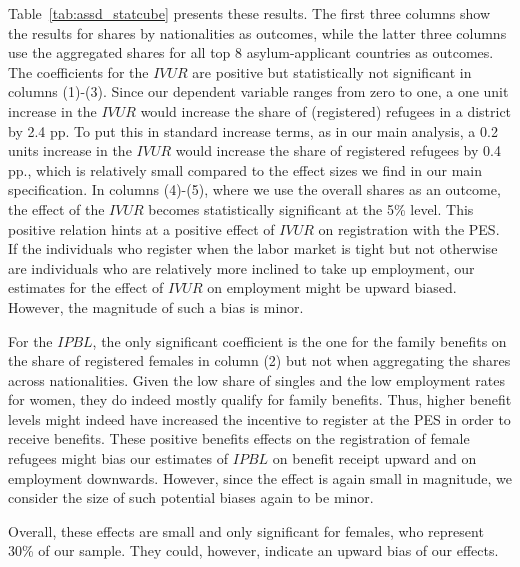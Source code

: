 Table~\ref{tab:assd_statcube} presents these results. The first three columns show the results for shares by nationalities as outcomes, while the latter three columns use the aggregated shares for all top 8 asylum-applicant countries as outcomes. The coefficients for the $IVUR$ are positive but statistically not significant in columns (1)-(3). Since our dependent variable ranges from zero to one, a one unit increase in the $IVUR$ would increase the share of (registered) refugees in a district by 2.4 pp. To put this in standard increase terms, as in our main analysis, a 0.2 units increase in the $IVUR$ would increase the share of registered refugees by 0.4 pp., which is relatively small compared to the effect sizes we find in our main specification. In columns (4)-(5), where we use the overall shares as an outcome, the effect of the $IVUR$ becomes statistically significant at the 5\% level. This positive relation hints at a positive effect of $IVUR$ on registration with the PES. If the individuals who register when the labor market is tight but not otherwise are individuals who are relatively more inclined to take up employment, our estimates for the effect of $IVUR$ on employment might be upward biased. However, the magnitude of such a bias is minor.

For the $IPBL$, the only significant coefficient is the one for the family benefits on the share of registered females in column (2) but not when aggregating the shares across nationalities. Given the low share of singles and the low employment rates for women, they do indeed mostly qualify for family benefits. Thus, higher benefit levels might indeed have increased the incentive to register at the PES in order to receive benefits. These positive benefits effects on the registration of female refugees might bias our estimates of $IPBL$ on benefit receipt upward and on employment downwards. However, since the effect is again small in magnitude, we consider the size of such potential biases again to be minor.

Overall, these effects are small and only significant for females, who represent 30\% of our sample. They could, however, indicate an upward bias of our effects. 

